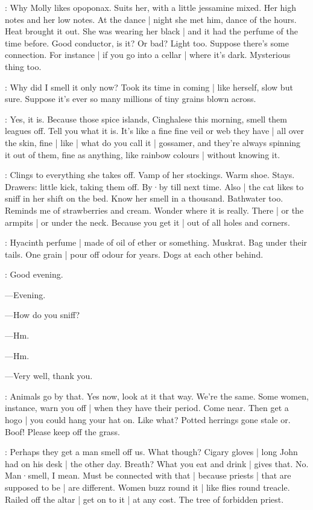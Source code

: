 \BloomHist:
Why Molly likes opoponax.
Suits her,
with a little jessamine mixed.
Her high notes and her low notes.
At the dance |
night she met him,
dance of the hours.
Heat brought it out.
She was wearing her black |
and it had the perfume of the time before.
Good conductor,
is it?
Or bad?
Light too.
Suppose there's some connection.
For instance |
if you go into a cellar |
where it's dark.
Mysterious thing too.

\BloomCurrent:
Why did I smell it only now?
Took its time in coming |
like herself,
slow but sure.
Suppose it's ever so many millions of tiny grains blown across.

\BloomAbstract:
Yes,
it is.
Because those spice islands,
Cinghalese this morning,
smell them leagues off.
Tell you what it is.
It's like a fine fine veil
or web they have |
all over the skin,
fine |
like |
what do you call it |
gossamer,%
and they're always spinning it out of them,
fine as anything,
like rainbow colours |
without knowing it.

\BloomHist:
Clings to everything she takes off.
Vamp of her stockings.
Warm shoe.
Stays.
Drawers:
little kick,
taking them off.
By·by till next time.
Also |
the cat likes to sniff in her shift
on the bed.
Know her smell in a thousand.
Bathwater too.
Reminds me of strawberries and cream.
Wonder where it is really.
There |
or the armpits |
or under the neck.
Because you get it |
out of all holes and corners.

\BloomAbstract:
Hyacinth perfume |
made of oil of ether or something.
Muskrat.
Bag under their tails.
One grain |
pour off odour for years.
Dogs at each other behind.

\BloomOther:
Good evening.

---Evening.

---How do you sniff?

---Hm.

---Hm.

---Very well,
thank you.

\BloomAbstract:
Animals go by that.%
Yes now,
look at it that way.
We're the same.
Some women,
instance,
warn you off |
when they have their period.
Come near.
Then get a hogo |
you could hang your hat on.
Like what?
Potted herrings gone stale or.
Boof!
Please keep off the grass.

\BloomAbstract:
Perhaps they get a man smell off us.
What though?
Cigary gloves |
long John had on his desk |
the other day.
Breath?
What you eat and drink |
gives that.
No.
Man·smell,
I mean.
Must be connected with that |
because priests |
that are supposed to be |
are different.
Women buzz round it |
like flies round treacle.
Railed off the altar |
get on to it |
at any cost.
The tree of forbidden priest.

